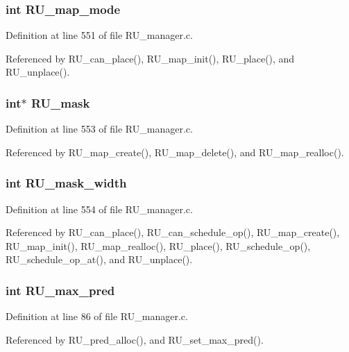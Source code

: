 \subsubsection{\setlength{\rightskip}{0pt plus 5cm}int \bf{RU\_\-map\_\-mode}}\label{RU__manager_8h_ab284499f85b8370428d80e89545a59a}




Definition at line 551 of file RU\_\-manager.c.

Referenced by RU\_\-can\_\-place(), RU\_\-map\_\-init(), RU\_\-place(), and RU\_\-unplace().
\subsubsection{\setlength{\rightskip}{0pt plus 5cm}int$\ast$ \bf{RU\_\-mask}}\label{RU__manager_8h_82ca50c94ed1893421f461fb9d7cd40e}




Definition at line 553 of file RU\_\-manager.c.

Referenced by RU\_\-map\_\-create(), RU\_\-map\_\-delete(), and RU\_\-map\_\-realloc().
\subsubsection{\setlength{\rightskip}{0pt plus 5cm}int \bf{RU\_\-mask\_\-width}}\label{RU__manager_8h_056f20a9e7273cb15678a35197ead400}




Definition at line 554 of file RU\_\-manager.c.

Referenced by RU\_\-can\_\-place(), RU\_\-can\_\-schedule\_\-op(), RU\_\-map\_\-create(), RU\_\-map\_\-init(), RU\_\-map\_\-realloc(), RU\_\-place(), RU\_\-schedule\_\-op(), RU\_\-schedule\_\-op\_\-at(), and RU\_\-unplace().
\subsubsection{\setlength{\rightskip}{0pt plus 5cm}int \bf{RU\_\-max\_\-pred}}\label{RU__manager_8h_b7005c442d3e96f4e308bc03d86a5e6f}




Definition at line 86 of file RU\_\-manager.c.

Referenced by RU\_\-pred\_\-alloc(), and RU\_\-set\_\-max\_\-pred().